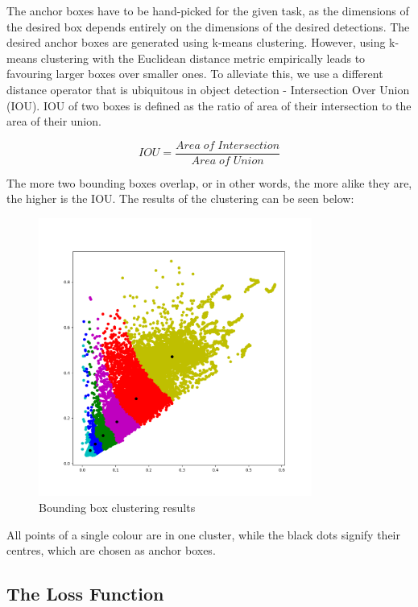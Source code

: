 \documentclass[12pt,letterpaper]{article}
\begin{document}
The anchor boxes have to be hand-picked for the given task, as the dimensions of the desired box depends entirely on the dimensions of the desired detections. The desired anchor boxes are generated using k-means clustering. However, using k-means clustering with the Euclidean distance metric empirically leads to favouring larger boxes over smaller ones. To alleviate this, we use a different distance operator that is ubiquitous in object detection - Intersection Over Union (IOU). IOU of two boxes is defined as the ratio of area of their intersection to the area of their union.

\[ IOU = \frac{Area\;of\;Intersection}{Area\;of\;Union} \]

The more two bounding boxes overlap, or in other words, the more alike they are, the higher is the IOU. The results of the clustering can be seen below:

    \begin{figure}[h!]
        \centering
        \includegraphics[width=0.8\textwidth,keepaspectratio]{assets/plot.png}
        \caption{Bounding box clustering results}
    \end{figure}

All points of a single colour are in one cluster, while the black dots signify their centres, which are chosen as anchor boxes.

\subsection{The Loss Function}
\end{document}
